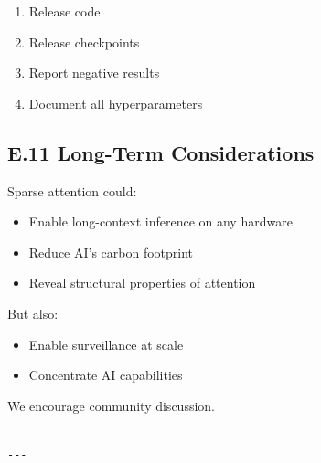 \begin{enumerate}
\item Release code
\item Release checkpoints
\item Report negative results
\item Document all hyperparameters

\end{enumerate}
\subsection{E.11 Long-Term Considerations}

Sparse attention could:

\begin{itemize}
\item Enable long-context inference on any hardware
\item Reduce AI's carbon footprint
\item Reveal structural properties of attention

\end{itemize}
But also:

\begin{itemize}
\item Enable surveillance at scale
\item Concentrate AI capabilities

\end{itemize}
We encourage community discussion.
\begin{lstlisting}

---
\end{lstlisting}